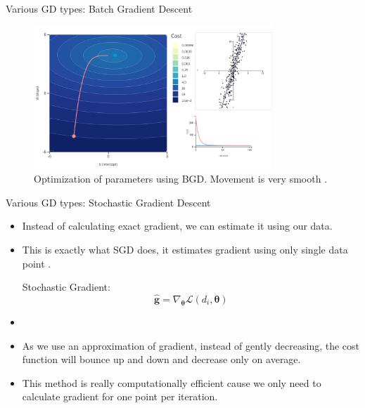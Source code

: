 \documentclass[compress,oilve,t]{beamer}
\newcommand{\tc}[2]{
	\textcolor{#1}{\hspace{-2pt}#2\hspace{-2pt}}
}
\begin{document}
\begin{frame}{Various GD types: Batch Gradient Descent}
	\begin{figure}[H]
		\centering
		\includegraphics[width=0.8\textwidth]{Figs/bgd.png}
		\caption{Optimization of parameters using BGD. Movement is very smooth \cite{katanforoosh-kunin-opt}.}
	\end{figure} 
\end{frame}

\begin{frame}{Various GD types: Stochastic Gradient Descent}
	\begin{itemize}
		\item Instead of calculating exact gradient, we can estimate it using our data.
		\item This is exactly what SGD does, it estimates gradient using \tc{keywords}{only single data point}.
		\begin{block}{Stochastic Gradient:}
			\[
			\hat{\bm{g}} = \nabla_{\bm{\theta}} \mathcal{L}(d_i, \bm{\theta})
			\]
		\end{block}
		\item[]
		\item As we use an approximation of gradient, instead of gently decreasing, the cost function will bounce up and down and decrease only on average.
		\item This method is really computationally efficient cause we only need to calculate gradient for one point per iteration. 
	\end{itemize}
\end{frame}
\end{document}

